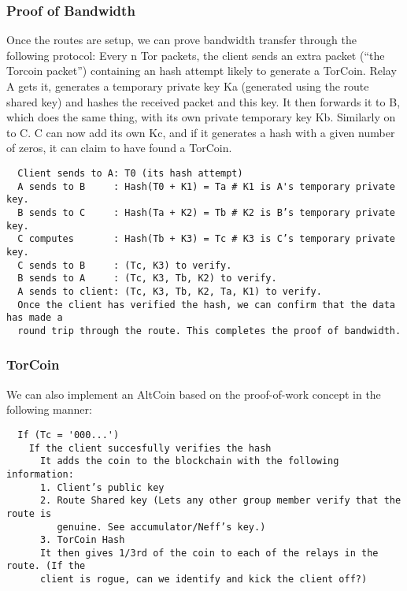 \subsubsection{Proof of Bandwidth}
Once the routes are setup, we can prove bandwidth transfer through the following protocol:
Every n Tor packets, the client sends an extra packet (“the Torcoin packet”) containing an hash attempt likely to generate a TorCoin. Relay A gets it, generates a temporary private key Ka (generated using the route shared key) and hashes the received packet and this key. It then forwards it to B, which does the same thing, with its own private temporary key Kb. Similarly on to C. C can now add its own Kc, and if it generates a hash with a given number of zeros, it can claim to have found a TorCoin.
  \begin{verbatim}
  Client sends to A: T0 (its hash attempt)
  A sends to B     : Hash(T0 + K1) = Ta # K1 is A's temporary private key.
  B sends to C     : Hash(Ta + K2) = Tb # K2 is B’s temporary private key.
  C computes       : Hash(Tb + K3) = Tc # K3 is C’s temporary private key.
  C sends to B     : (Tc, K3) to verify.
  B sends to A     : (Tc, K3, Tb, K2) to verify.
  A sends to client: (Tc, K3, Tb, K2, Ta, K1) to verify.
  Once the client has verified the hash, we can confirm that the data has made a 
  round trip through the route. This completes the proof of bandwidth.
  \end{verbatim}

\subsubsection{TorCoin}
We can also implement an AltCoin based on the proof-of-work concept in the following manner:
  \begin{verbatim}
  If (Tc = '000...')
    If the client succesfully verifies the hash
      It adds the coin to the blockchain with the following information:
      1. Client’s public key
      2. Route Shared key (Lets any other group member verify that the route is 
         genuine. See accumulator/Neff’s key.)
      3. TorCoin Hash
      It then gives 1/3rd of the coin to each of the relays in the route. (If the 
      client is rogue, can we identify and kick the client off?)
  \end{verbatim}